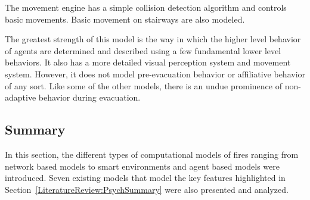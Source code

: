The movement engine has a simple collision detection algorithm and controls basic movements. Basic movement on stairways are also modeled.

The greatest strength of this model is the way in which the higher level behavior of agents are determined and described using a few fundamental lower level behaviors. It also has a more detailed visual perception system and movement system. However, it does not model pre-evacuation behavior or affiliative behavior of any sort. Like some of the other models, there is an undue prominence of non-adaptive behavior during evacuation.

\subsection{Summary}
\label{LiteratureReview:EngineeringSummary}
In this section, the different types of computational models of fires ranging from network based models to smart environments and agent based models were introduced. Seven existing models that model the key features highlighted in Section~\ref{LiteratureReview:PsychSummary} were also presented and analyzed.
